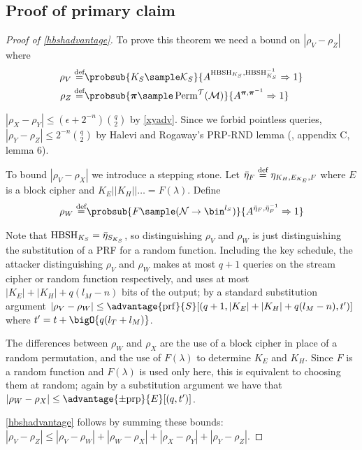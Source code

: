 \documentclass[eprint.tex]{subfiles}
\begin{document}
\subsection{Proof of primary claim}
\begin{proof}[Proof of \autoref{hbshadvantage}]\label{hbshproof}
    To prove this theorem we need a bound on $|\rho_V - \rho_Z|$
    where
    \begin{align*}
        \rho_V \defeq& \probsub{K_S \sample \mathcal{K}_S}
            {A^{\HBSH_{K_S}, \HBSH_{K_S}^{-1}}\Rightarrow 1} \\
        \rho_Z \defeq& \probsub{\bm{\pi} \sample \Perm^\mathcal{T}(\mathcal{M})}
            {A^{\bm{\pi},\bm{\pi}^{-1}}\Rightarrow 1} \\
    \end{align*}

    $|\rho_X - \rho_Y| \leq (\epsilon + 2^{-n})\binom{q}{2}$ by \autoref{xyadv}.
    Since we forbid pointless queries,
    $|\rho_Y - \rho_Z| \leq 2^{-n}\binom{q}{2}$ by Halevi and Rogaway's PRP-RND lemma
    (\cite{cmc}, appendix C, lemma 6).

    To bound $|\rho_V - \rho_X|$ we introduce
    a stepping stone. Let $\bar{\eta}_{F} \stackrel{\text{def}}{=} \eta_{K_H, E_{K_E}, F}$ where
    $E$ is a block cipher and $K_E || K_H || \ldots = F(\lambda)$. Define
    \begin{align*}
        \rho_W \defeq& \probsub{F \sample (\mathcal{N} \rightarrow \bin^{l_S})}
            {A^{\bar{\eta}_{F}, \bar{\eta}_{F}^{-1}}\Rightarrow 1} \\
    \end{align*}

    Note that $\operatorname{HBSH}_{K_S} = \bar{\eta}_{S_{K_S}}$, so distinguishing
    $\rho_V$ and $\rho_W$ is just distinguishing the substitution of a PRF
    for a random function.
    Including the key schedule, the attacker distinguishing
    $\rho_V$ and $\rho_W$ makes at most $q + 1$ queries on the stream cipher
    or random function respectively, and uses at most $|K_E| + |K_H| + q(l_M - n)$ bits
    of the output; by a standard substitution argument
    $|\rho_V - \rho_W| \leq
    \advantage{\mathrm{prf}}{S}[(q + 1, |K_E| + |K_H| + q(l_M - n), t')]$
    where $t' = t + \bigO{q(l_T + l_M)}$.

    The differences between $\rho_W$ and $\rho_X$ are the use of a block cipher
    in place of a random permutation, and the use of $F(\lambda)$ to determine
    $K_E$ and $K_H$. Since $F$ is a random function and $F(\lambda)$ is used
    only here, this is equivalent to choosing them at random; again by a substitution
    argument we have that $|\rho_W - \rho_X| \leq \advantage{\pm \mathrm{prp}}{E}[(q, t')]$.

    \autoref{hbshadvantage} follows by summing these bounds:
    $|\rho_V - \rho_Z| \leq
    |\rho_V - \rho_W| + |\rho_W - \rho_X| + |\rho_X - \rho_Y| + |\rho_Y - \rho_Z|$.
\end{proof}

\subbib
\end{document}
